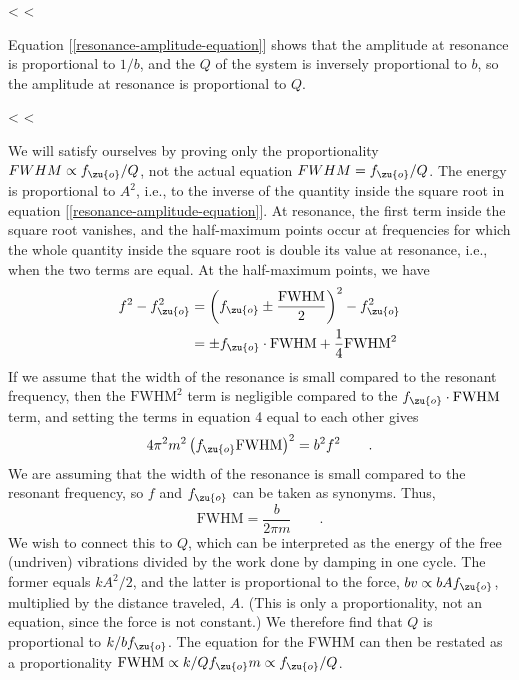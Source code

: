 <%
<%

Equation [\ref{resonance-amplitude-equation}] shows that the amplitude at resonance is
proportional to $1/b$, and the $Q$ of the system is
inversely proportional to $b$, so the amplitude at resonance
is proportional to $Q$.

<%
<%

We will satisfy ourselves by proving only the proportionality
$FWHM\propto f_\zu{o}/Q$, not the actual equation $FWHM=f_\zu{o}/Q$.
The energy is proportional to $A^2$, i.e., to the inverse of
the quantity inside the square root in equation [\ref{resonance-amplitude-equation}]. At
resonance, the first term inside the square root vanishes,
and the half-maximum points occur at frequencies for which
the whole quantity inside the square root is double its
value at resonance, i.e., when the two terms are equal. At
the half-maximum points, we have
\begin{align*}
  f^2-f_\zu{o}^2 &= \left(f_\zu{o} \pm \frac{\text{FWHM}}{2}\right)^2 - f_\zu{o}^2\\
                &= \pm f_\zu{o}\cdot \text{FWHM} + \frac{1}{4}\text{FWHM}^2
\end{align*}
If we assume that the width of the resonance is small
compared to the resonant frequency, then the $\text{FWHM}^2$ term 
is negligible compared to the $f_\zu{o}\cdot \text{FWHM}$ term, and setting
the terms in equation 4 equal to each other gives
\begin{equation*}
  4\pi^2m^2\left(f_\zu{o}\text{FWHM}\right)^2  = b^2f^2    \qquad   .
\end{equation*}
We are assuming that the width of the resonance is small
compared to the resonant frequency, so $f$ and $f_\zu{o}$ can
be taken as synonyms. Thus,
\begin{equation*}
                        \text{FWHM}  = \frac{b}{2\pi m}   \qquad   .
\end{equation*}
We wish to connect this to $Q$, which can be interpreted as
the energy of the free (undriven) vibrations divided by the
work done by damping in one cycle. The former equals
$kA^2/2$, and the latter is proportional to the force,
$bv\propto bAf_\zu{o}$, multiplied by the distance traveled,
$A$. (This is only a proportionality, not an equation, since
the force is not constant.) We therefore find that $Q$ is
proportional to $k/bf_\zu{o}$. The equation for the FWHM can
then be restated as a proportionality $\text{FWHM}\propto k/Qf_\zu{o}m\propto f_\zu{o}/Q$.

